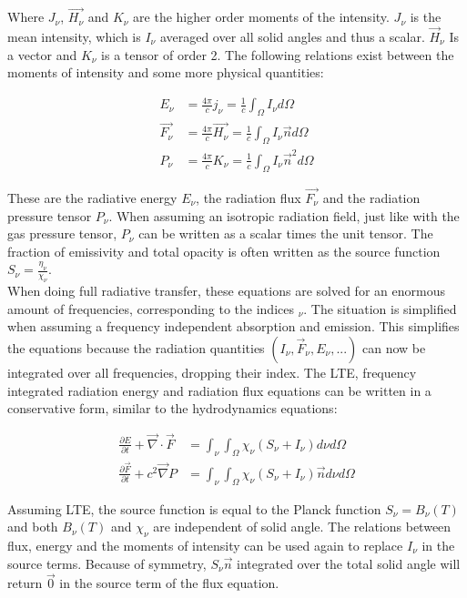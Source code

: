 Where $J_\nu$, $\vec{H_\nu}$ and $K_\nu$ are the higher order moments of the intensity. $J_\nu$ is the mean intensity, which is $I_\nu$ averaged over all solid angles and thus a scalar. $\vec{H}_\nu$ Is a vector and $K_\nu$ is a tensor of order 2. The following relations exist between the moments of intensity and some more physical quantities:

\begin{align}
E_\nu &= \frac{4 \pi}{c} j_\nu = \frac{1}{c} \int_\Omega I_\nu d \Omega\\
\vec{F_\nu} &= \frac{4 \pi}{c} \vec{H_\nu} = \frac{1}{c} \int_\Omega I_\nu \vec{n} d \Omega\\
P_\nu &= \frac{4 \pi}{c} K_\nu = \frac{1}{c} \int_\Omega I_\nu \vec{n}^2 d \Omega
\end{align}

These are the radiative energy $E_\nu$, the radiation flux $\vec{F_\nu}$ and the radiation pressure tensor $P_\nu$. When assuming an isotropic radiation field, just like with the gas pressure tensor, $P_\nu$ can be written as a scalar times the unit tensor. The fraction of emissivity and total opacity is often written as the source function $S_\nu = \frac{\eta_\nu}{\chi_\nu}$. \\
 When doing full radiative transfer, these equations are solved for an enormous amount of frequencies, corresponding to the indices $_\nu$. The situation is simplified when assuming a frequency independent absorption and emission. This simplifies the equations because the radiation quantities $(I_\nu, \vec{F}_\nu, E_\nu, ...)$ can now be integrated over all frequencies, dropping their index. The LTE, frequency integrated radiation energy and radiation flux equations can be written in a conservative form, similar to the hydrodynamics equations: 

\begin{align}
\frac{\partial E}{\partial t} + \vec{\nabla} \cdot \vec{F} &= \int_\nu \int_\Omega \chi_\nu \left( S_\nu + I_\nu \right) d\nu d\Omega \label{eq: E_si}\\
\frac{\partial \vec{F}}{\partial t} + c^2 \vec{\nabla} P &= \int_\nu \int_\Omega \chi_\nu \left( S_\nu + I_\nu \right) \vec{n} d\nu d\Omega \label{F_si}
\end{align}

Assuming LTE, the source function is equal to the Planck function $S_\nu = B_\nu(T)$ and both $B_\nu(T)$ and $\chi_\nu$ are independent of solid angle. The relations between flux, energy and the moments of intensity can be used again to replace $I_\nu$ in the source terms. Because of symmetry, $S_\nu \vec{n}$ integrated over the total solid angle will return $\vec{0}$ in the source term of the flux equation.\\

